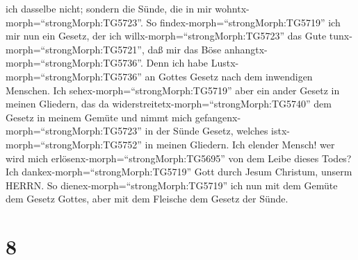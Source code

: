 ich dasselbe nicht; sondern die Sünde, die in mir
wohntx-morph=``strongMorph:TG5723''.  So
findex-morph=``strongMorph:TG5719'' ich mir nun ein Gesetz, der ich
willx-morph=``strongMorph:TG5723'' das Gute
tunx-morph=``strongMorph:TG5721'', daß mir das Böse
anhangtx-morph=``strongMorph:TG5736''.  Denn ich habe
Lustx-morph=``strongMorph:TG5736'' an Gottes Gesetz nach dem inwendigen
Menschen.  Ich sehex-morph=``strongMorph:TG5719'' aber ein
ander Gesetz in meinen Gliedern, das da
widerstreitetx-morph=``strongMorph:TG5740'' dem Gesetz in meinem Gemüte
und nimmt mich gefangenx-morph=``strongMorph:TG5723'' in der Sünde
Gesetz, welches istx-morph=``strongMorph:TG5752'' in meinen Gliedern.
 Ich elender Mensch! wer wird mich
erlösenx-morph=``strongMorph:TG5695'' von dem Leibe dieses Todes?
 Ich dankex-morph=``strongMorph:TG5719'' Gott durch Jesum
Christum, unserm HERRN. So dienex-morph=``strongMorph:TG5719'' ich nun
mit dem Gemüte dem Gesetz Gottes, aber mit dem Fleische dem Gesetz der
Sünde.

\hypertarget{section-7}{%
\section{8}\label{section-7}}

